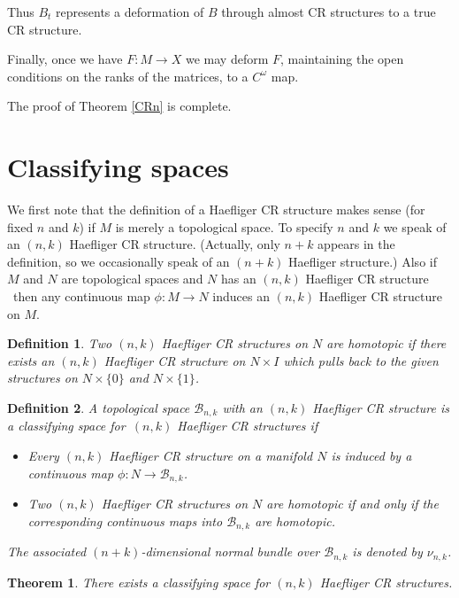 \documentclass{amsart}
\newtheorem{theorem}{Theorem}[section]
\newtheorem{definition}{Definition}
\begin{document}
Thus $B_t$ represents a deformation of $B$ through almost CR
structures to a true   CR structure.

Finally, once we have $F:M\to X  $ we may deform $F$, maintaining the open conditions on the ranks of the matrices, to a $C^\omega$ map.

The proof of Theorem \ref{CRn} is complete.

\section{Classifying spaces}

We first note that the definition of a Haefliger CR structure makes
sense (for fixed $n$ and $k$) if $M$ is merely a topological space.
To specify $n$ and $k$  we  speak of an $(n,k)$ {Haefliger CR structure}.  (Actually, only
$n+k$ appears in the definition, so we occasionally speak of an $(n+k)$ Haefliger structure.)  
Also if $M$ and $N$ are topological
spaces and $N$ has an $(n,k)$ {Haefliger CR structure} \ then any 
 continuous map $\phi:M\to N$ induces an $(n,k)$ Haefliger  CR
 structure on $M$.
 
\begin{definition}
 Two $(n,k)$ Haefliger  CR structures on $N$ are homotopic if
 there exists an   $(n,k)$ Haefliger  CR structure on $N\times I$
 which pulls back to the given structures on $N\times \{0\}$ and
 $N\times \{1\}$.
\end{definition}

\begin{definition}
A topological space ${{\mathcal B}}_{n,k}$ with an $(n,k)$ Haefliger  CR structure  is a classifying space for\ $(n,k)$  Haefliger  CR structures if 
\begin{itemize}
\item Every $(n,k)$ Haefliger  CR structure  on a manifold $N$ is induced by a continuous map $\phi :N\to {{\mathcal B}}_{n,k}$.
\item Two $(n,k)$ Haefliger  CR structures on $N$ are homotopic  if and only if the corresponding continuous maps into ${{\mathcal B}}_{n,k}$ are homotopic.
\end{itemize}
The associated $(n+k)$-dimensional normal bundle over ${{\mathcal B}}_{n,k}$ is denoted by $\nu_{n,k}$.
\end{definition}

\begin{theorem}
There exists a classifying space for $(n,k)$ Haefliger  CR structures.
\end{theorem}
\end{document}
